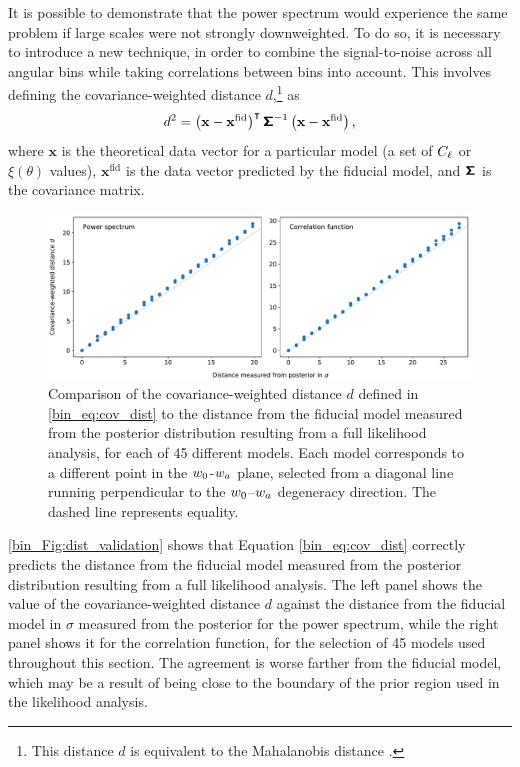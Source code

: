 It is possible to demonstrate that the power spectrum would experience the same problem if large scales were not strongly downweighted. To do so, it is necessary to introduce a new technique, in order to combine the signal-to-noise across all angular bins while taking correlations between bins into account. This involves defining the covariance-weighted distance $d$,\footnote{This distance $d$ is equivalent to the Mahalanobis distance
\citep{Mahalanobis1936}.} as
\begin{equation}
d^2 = \left( \mathbf{x} - \mathbf{x}^\text{fid} \right)^\intercal
\bm{\mathsf{\Sigma}}^{-1}
\left( \mathbf{x} - \mathbf{x}^\text{fid} \right),
\label{bin_eq:cov_dist}
\end{equation}
where $\mathbf{x}$ is the theoretical data vector for a particular model (a set of $C_\ell$ or $\xi \left( \theta \right)$ values), $\mathbf{x}^\text{fid}$ is the data vector predicted by the fiducial model, and $\bm{\mathsf{\Sigma}}$ is the covariance matrix.

\begin{figure}[tp]
\includegraphics[width=\textwidth]{dist_validation}
\caption{Comparison of the covariance-weighted distance $d$ defined in \eqref{bin_eq:cov_dist} to the distance from the fiducial model measured from the posterior distribution resulting from a full likelihood analysis, for each of 45 different models. Each model corresponds to a different point in the $w_0$-$w_a$ plane, selected from a diagonal line running perpendicular to the $w_0$--$w_a$ degeneracy direction. The dashed line represents equality.}
\label{bin_Fig:dist_validation}
\end{figure}

\autoref{bin_Fig:dist_validation} shows that Equation \eqref{bin_eq:cov_dist} correctly predicts the distance from the fiducial model measured from the posterior distribution resulting from a full likelihood analysis. The left panel shows the value of the covariance-weighted distance $d$ against the distance from the fiducial model in $\sigma$ measured from the posterior for the power spectrum, while the right panel shows it for the correlation function, for the selection of 45 models used throughout this section. The agreement is worse farther from the fiducial model, which may be a result of being close to the boundary of the prior region used in the likelihood analysis.

